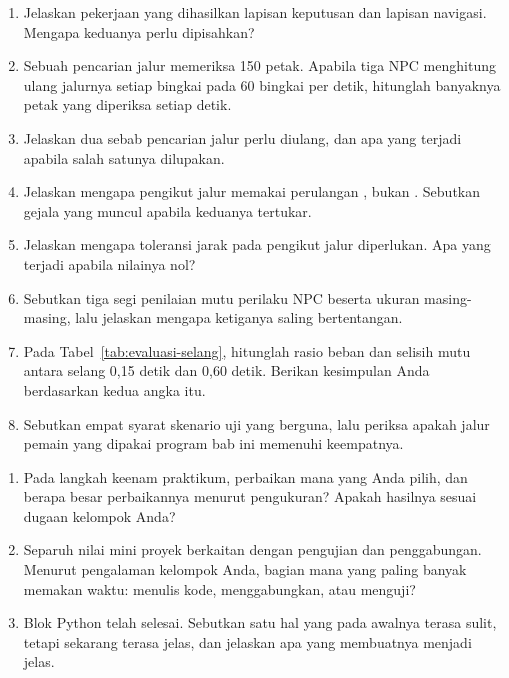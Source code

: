 
\begin{enumerate}
  \item Jelaskan pekerjaan yang dihasilkan lapisan keputusan dan lapisan
        navigasi. Mengapa keduanya perlu dipisahkan?

  \item Sebuah pencarian jalur memeriksa 150 petak. Apabila tiga NPC
        menghitung ulang jalurnya setiap bingkai pada 60 bingkai per detik,
        hitunglah banyaknya petak yang diperiksa setiap detik.

  \item Jelaskan dua sebab pencarian jalur perlu diulang, dan apa yang terjadi
        apabila salah satunya dilupakan.

  \item Jelaskan mengapa pengikut jalur memakai perulangan ,
        bukan . Sebutkan gejala yang muncul apabila keduanya tertukar.

  \item Jelaskan mengapa toleransi jarak pada pengikut jalur diperlukan.
        Apa yang terjadi apabila nilainya nol?

  \item Sebutkan tiga segi penilaian mutu perilaku NPC beserta ukuran
        masing-masing, lalu jelaskan mengapa ketiganya saling bertentangan.

  \item Pada Tabel~\ref{tab:evaluasi-selang}, hitunglah rasio beban dan selisih
        mutu antara selang 0,15 detik dan 0,60 detik. Berikan kesimpulan Anda
        berdasarkan kedua angka itu.

  \item Sebutkan empat syarat skenario uji yang berguna, lalu periksa apakah
        jalur pemain yang dipakai program bab ini memenuhi keempatnya.
\end{enumerate}

\begin{refleksibox}
\begin{enumerate}
  \item Pada langkah keenam praktikum, perbaikan mana yang Anda pilih, dan
        berapa besar perbaikannya menurut pengukuran? Apakah hasilnya sesuai
        dugaan kelompok Anda?
  \item Separuh nilai mini proyek berkaitan dengan pengujian
        dan penggabungan. Menurut pengalaman kelompok Anda, bagian mana yang
        paling banyak memakan waktu: menulis kode, menggabungkan, atau menguji?
  \item Blok Python telah selesai. Sebutkan satu hal yang pada awalnya terasa
        sulit, tetapi sekarang terasa jelas, dan jelaskan apa yang membuatnya
        menjadi jelas.
\end{enumerate}
\end{refleksibox}
